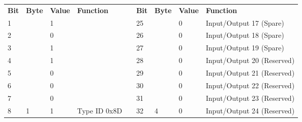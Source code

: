 \documentclass[]{article}
\begin{document}
\begin{landscape}
	\begin{table}[]
		\begin{tabular}{lllllllll}
			\cline{1-4} \cline{6-9}
			\textbf{Bit} & \textbf{Byte}       & \textbf{Value} & \textbf{Function}                               &                    & \textbf{Bit} & \textbf{Byte}       & \textbf{Value} & \textbf{Function}                                  \\ \cline{1-4} \cline{6-9} 
			1            &                     & 1              &                                                 &                    & 25           &                     & 0              & \cellcolor[HTML]{EFEFEF}Input/Output 17 (Spare)    \\
			2            &                     & 0              &                                                 &                    & 26           &                     & 0              & \cellcolor[HTML]{EFEFEF}Input/Output 18 (Spare)    \\
			3            &                     & 1              &                                                 &                    & 27           &                     & 0              & \cellcolor[HTML]{EFEFEF}Input/Output 19 (Spare)    \\
			4            &                     & 1              &                                                 &                    & 28           &                     & 0              & \cellcolor[HTML]{EFEFEF}Input/Output 20 (Reserved) \\
			5            &                     & 0              &                                                 &                    & 29           &                     & 0              & \cellcolor[HTML]{EFEFEF}Input/Output 21 (Reserved) \\
			6            &                     & 0              &                                                 &                    & 30           &                     & 0              & \cellcolor[HTML]{EFEFEF}Input/Output 22 (Reserved) \\
			7            &                     & 0              &                                                 &                    & 31           &                     & 0              & \cellcolor[HTML]{EFEFEF}Input/Output 23 (Reserved) \\
			8            & \multirow{-8}{*}{1} & 1              & \multirow{-8}{*}{Type ID 0x8D}                  & \multirow{-9}{*}{} & 32           & \multirow{-8}{*}{4} & 0              & \cellcolor[HTML]{EFEFEF}Input/Output 24 (Reserved) \\ \cline{1-4} \cline{6-9} 

\end{tabular}
\end{table}
\end{landscape}
\end{document}
